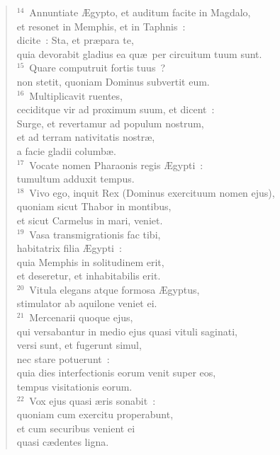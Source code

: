\begin{flushleft}\begin{verse}${}^{14}$~Annuntiate \AE gypto, et auditum facite in Magdalo,\\ et resonet in Memphis, et in Taphnis~:\\ dicite~: Sta, et pr\ae para te,\\ quia devorabit gladius ea qu\ae\ per circuitum tuum sunt.\\
${}^{15}$~Quare computruit fortis tuus~?\\ non stetit, quoniam Dominus subvertit eum.\\
${}^{16}$~Multiplicavit ruentes,\\ ceciditque vir ad proximum suum, et dicent~:\\ Surge, et revertamur ad populum nostrum,\\ et ad terram nativitatis nostr\ae ,\\ a facie gladii columb\ae .\\
${}^{17}$~Vocate nomen Pharaonis regis \AE gypti~:\\ tumultum adduxit tempus.\\
${}^{18}$~Vivo ego, inquit Rex (Dominus exercituum nomen ejus),\\ quoniam sicut Thabor in montibus,\\ et sicut Carmelus in mari, veniet.\\
${}^{19}$~Vasa transmigrationis fac tibi,\\ habitatrix filia \AE gypti~:\\ quia Memphis in solitudinem erit,\\ et deseretur, et inhabitabilis erit.\\
${}^{20}$~Vitula elegans atque formosa \AE gyptus,\\ stimulator ab aquilone veniet ei.\\
${}^{21}$~Mercenarii quoque ejus,\\ qui versabantur in medio ejus quasi vituli saginati,\\ versi sunt, et fugerunt simul,\\ nec stare potuerunt~:\\ quia dies interfectionis eorum venit super eos,\\ tempus visitationis eorum.\\
${}^{22}$~Vox ejus quasi \ae ris sonabit~:\\ quoniam cum exercitu properabunt,\\ et cum securibus venient ei\\ quasi c\ae dentes ligna.\\

\end{verse}
\end{flushleft}
